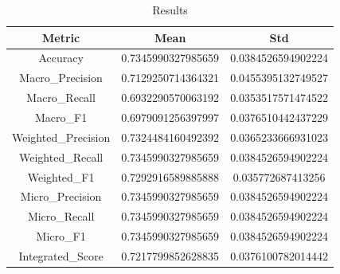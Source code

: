 \begin{table}[htbp]
\centering
\caption{Results}
\label{tab:csv}
\small
\setlength{\tabcolsep}{4pt}
\begin{tabular}{|c|c|c|}
\hline
Metric & Mean & Std \\
\hline
Accuracy & 0.7345990327985659 & 0.0384526594902224 \\
Macro_Precision & 0.7129250714364321 & 0.0455395132749527 \\
Macro_Recall & 0.6932290570063192 & 0.0353517571474522 \\
Macro_F1 & 0.6979091256397997 & 0.0376510442437229 \\
Weighted_Precision & 0.7324484160492392 & 0.0365233666931023 \\
Weighted_Recall & 0.7345990327985659 & 0.0384526594902224 \\
Weighted_F1 & 0.7292916589885888 & 0.035772687413256 \\
Micro_Precision & 0.7345990327985659 & 0.0384526594902224 \\
Micro_Recall & 0.7345990327985659 & 0.0384526594902224 \\
Micro_F1 & 0.7345990327985659 & 0.0384526594902224 \\
Integrated_Score & 0.7217799852628835 & 0.0376100782014442 \\
\hline
\end{tabular}
\end{table}